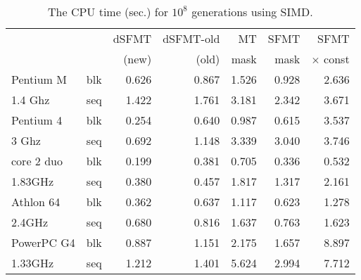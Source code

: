 \documentclass{svmult}
\begin{document}
\begin{table}
  \begin{center}
    \caption{The CPU time (sec.) for $10^8$ generations using SIMD.}
    \label{tab:speed-simd}
    \begin{tabular}{|ll|r|r|r|r|r|} \hline
      && dSFMT & dSFMT-old & MT & SFMT & SFMT \\
      && (new) & (old) & mask & mask & $\times$ const \\ \hline \hline
      Pentium M & blk & 0.626 & 0.867 & 1.526 & 0.928 & 2.636 \\
      1.4 Ghz & seq & 1.422 & 1.761 & 3.181 & 2.342 & 3.671 \\ \hline
      Pentium 4 & blk & 0.254 & 0.640 & 0.987 & 0.615 & 3.537 \\
      3 Ghz & seq & 0.692 & 1.148 & 3.339 & 3.040 & 3.746 \\ \hline
      core 2 duo & blk & 0.199 & 0.381 & 0.705 & 0.336 & 0.532 \\
      1.83GHz & seq & 0.380 & 0.457 & 1.817 & 1.317 & 2.161 \\\hline
      Athlon 64 & blk & 0.362 & 0.637 & 1.117 & 0.623 & 1.278 \\
      2.4GHz & seq & 0.680 & 0.816 & 1.637 & 0.763 & 1.623 \\ \hline
      PowerPC G4& blk & 0.887 & 1.151 & 2.175 & 1.657 & 8.897 \\
      1.33GHz & seq & 1.212 & 1.401 & 5.624 & 2.994 & 7.712 \\ \hline
    \end{tabular}
  \end{center}
\end{table}
\end{document}
